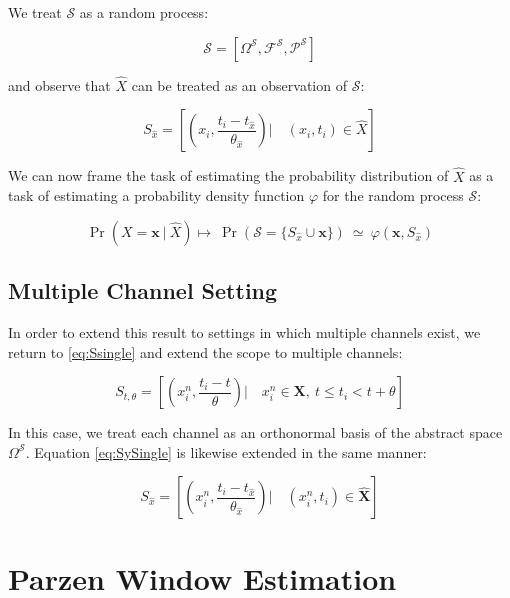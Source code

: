 \documentclass[10pt]{article}
\begin{document}
We treat \( \mathcal{S} \) as a random process:

\[ \mathcal{S} = [ \Omega^\mathcal{S}, \mathcal{F}^\mathcal{S},\mathcal{P}^\mathcal{S}] \]

 and observe that \( \hat{X} \) can be treated as an observation of \( \mathcal{S} \):

\begin{equation} \label{eq:SySingle} 
S_{\hat{x}} =  \left[ \left( x_i,\frac{t_i - t_{\hat{x}}}{\theta_{\hat{x}}} \right) \Big| \quad (x_i,t_i) \in \hat{X} \right] 
\end{equation}

We can now frame the task of estimating the probability distribution of \( \hat{X} \) as a task of estimating a probability density function \( \varphi \) for the random process \( \mathcal{S} \): 

\begin{equation} \label{eq:PrS}
\Pr( X = \mathbf{x} \ | \ \hat{X} ) \mapsto \ \Pr( \mathcal{S} = \{ S_{\hat{x}} \cup \mathbf{x} \} ) \ \simeq \ \varphi( \mathbf{x}, S_{\hat{x}} )
\end{equation}


\subsection{Multiple Channel Setting}

In order to extend this result to settings in which multiple channels exist, we return to \ref{eq:Ssingle} and extend the scope to multiple channels:

\begin{equation} \label{eq:Smultiple} S_{t,\theta} = \left[ \left( x_i^n,\frac{t_i - t}{\theta} \right) \Big| \quad x_i^n \in \mathbf{X}, \ t \le t_i < t+\theta \right] \end{equation}

In this case, we treat each channel as an orthonormal basis of the abstract space \( \Omega^\mathcal{S} \).  Equation \ref{eq:SySingle} is likewise extended in the same manner:

\begin{equation} \label{eq:SyMultiple} 
S_{\hat{x}} =  \left[ \left( x_i^n,\frac{t_i - t_{\hat{x}}}{\theta_{\hat{x}}} \right) \Big| \quad (x_i^n,t_i) \in \mathbf{\hat{X}} \right] 
\end{equation}

\section{ Parzen Window Estimation}
\end{document}

